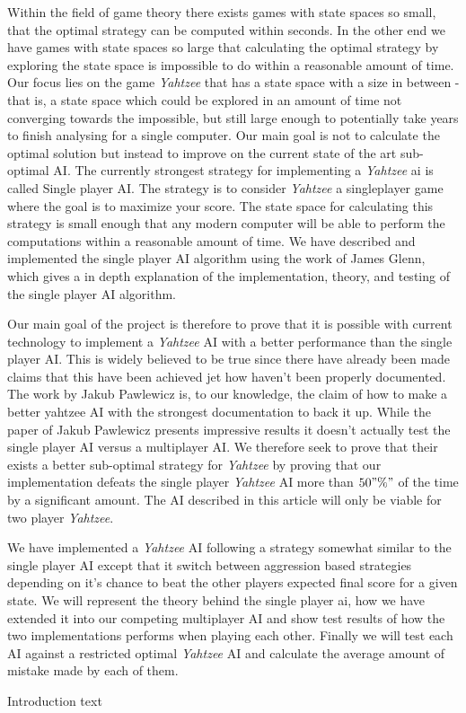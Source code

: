 Within the field of game theory there exists games with state spaces so small, that the optimal strategy can be computed within seconds. In the other end we have games with state spaces so large that calculating the optimal strategy by exploring the state space is impossible to do within a reasonable amount of time. Our focus lies on the game \emph{Yahtzee} that has a state space with a size in between - that is, a state space which could be explored in an amount of time not converging towards the impossible, but still large enough to potentially take years to finish analysing for a single computer. Our main goal is not to calculate the optimal solution but instead to improve on the current state of the art sub-optimal AI. The currently strongest strategy for implementing a \emph{Yahtzee} ai is called Single player AI. The strategy is to consider \emph{Yahtzee} a singleplayer game where the goal is to maximize your score. The state space for calculating this strategy is small enough that any modern computer will be able to perform the computations within a reasonable amount of time. We have described and implemented the single player AI algorithm using the work of James Glenn\cite{glenn2006optimal}, which gives a in depth explanation of the implementation, theory, and testing of the single player AI algorithm.

Our main goal of the project is therefore to prove that it is possible with current technology to implement a \emph{Yahtzee} AI with a better performance than the single player AI. This is widely believed to be true since there have already been made claims that this have been achieved jet how haven't been properly documented. The work by Jakub Pawlewicz is, to our knowledge, the claim of how to make a  better yahtzee AI with the strongest documentation to back it up. While the paper of Jakub Pawlewicz presents impressive results it doesn't actually test the single player AI versus a multiplayer AI. We therefore seek to prove that their exists a better sub-optimal strategy for \emph{Yahtzee} by proving that our implementation defeats the single player \emph{Yahtzee} AI more than $50"\%" $ of the time by a significant amount. The AI described in this article will only be viable for two player \emph{Yahtzee}.

We have implemented a \emph{Yahtzee} AI following a strategy somewhat similar to the single player AI except that it switch between aggression based strategies depending on it's chance to beat the other players expected final score for a given state. We will represent the theory behind the single player ai, how we have extended it into our competing multiplayer AI and show test results of how the two implementations performs when playing each other. Finally we will test each AI against a restricted optimal \emph{Yahtzee} AI and calculate the average amount of mistake made by each of them.

Introduction text
